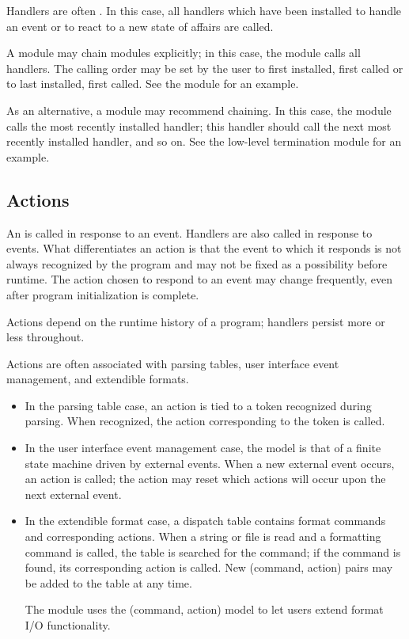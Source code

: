 Handlers are often .  In this case, all handlers which
have been installed to handle an event or to react to a new state of affairs
are called.

A module may chain modules explicitly; in this case, the module calls all
handlers.  The calling order may be set by the user to first installed,
first called or to last installed, first called.  See the 
module for an example.

As an alternative, a module may recommend chaining.  In this case, the
module calls the most recently installed handler; this handler should call
the next most recently installed handler, and so on.
See the low-level termination module  for
an example.

\subsection{Actions}

An  is called in response to an event.  Handlers are also
called in response to events. What differentiates an action is that
the event to which it responds is not always recognized by the program and
may not be fixed as a possibility before runtime.  The action chosen to
respond to an event may change frequently, even after program initialization
is complete.

Actions depend on the runtime history of a program; handlers persist more or
less throughout.

Actions are often associated with parsing tables, user interface event
management, and extendible formats.
\begin{itemize}
\item
 In the parsing table case, an action is tied to a token recognized during
 parsing.  When recognized, the action corresponding to the token is called.
\item
 In the user interface event management case, the model is that of a finite
 state machine driven by external events.  When a new external event occurs,
 an action is called; the action may reset which actions will occur
 upon the next external event.
\item
 In the extendible format case, a dispatch table contains format commands and
 corresponding actions.  When a string or file is read and a formatting
 command is called, the table is searched for the command; if the command
 is found, its corresponding action is called.  New (command, action) pairs
 may be added to the table at any time.

 The  module uses the (command, action) model to let users
 extend format I/O functionality.
\end{itemize}

